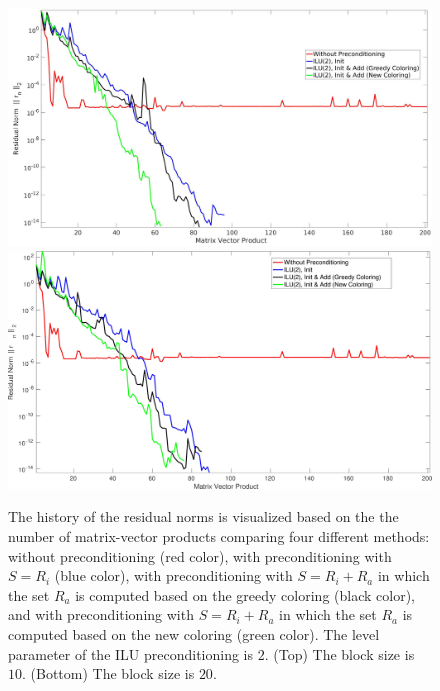\documentclass[12pt, twoside,a4paper,toc=bibliography]{scrbook}
\begin{document}
\begin{figure}
\centering
\includegraphics[width=\linewidth]{jac_convergence_greedy_new.jpg}
\vfill
\includegraphics[width=\linewidth]{jac_convergence_greedy_new_bl20.jpg}
\caption{
The history of the residual norms is visualized based on the 
the number of matrix-vector products comparing four different methods:
without preconditioning (red color), 
with preconditioning with $S=R_i$ (blue color),
with preconditioning with $S=R_i + R_a$ in which 
the set $R_a$ is computed based on the greedy coloring (black color),
and with preconditioning with $S=R_i + R_a$ in which 
the set $R_a$ is computed based on the new coloring (green color).
The level parameter of the ILU preconditioning is $2$.
(Top) The block size is $10$. 
(Bottom) The block size is $20$.
}
\label{f.convergence_greedy_new2}
\end{figure}

\end{document}
